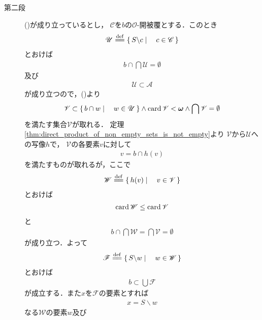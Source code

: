 \begin{sketch}
\begin{description}
			\item[第二段]
				()が成り立っているとし，
				$\mathscr{C}$を$b$の$\mathscr{O}$-開被覆とする．このとき
				\begin{align}
					\mathscr{U} \defeq \Set{S \backslash c}{c \in \mathscr{C}}
				\end{align}
				とおけば
				\begin{align}
					b \cap \bigcap \mathscr{U} = \emptyset
				\end{align}
				及び
				\begin{align}
					\mathscr{U} \subset \mathscr{A}
				\end{align}
				が成り立つので，()より
				\begin{align}
					\mathscr{V} \subset \left\{\, b \cap w \mid \quad w \in \mathscr{U}\, \right\}
					\wedge \operatorname{card} \mathscr{V} < {\boldsymbol \omega}
					\wedge \bigcap \mathscr{V} = \emptyset
				\end{align}
				を満たす集合$\mathscr{V}$が取れる．
				定理\ref{thm:direct_product_of_non_empty_sets_is_not_empty}より
				$\mathscr{V}$から$\mathscr{U}$への写像$h$で，
				$\mathscr{V}$の各要素$v$に対して
				\begin{align}
					v = b \cap h(v)
				\end{align}
				を満たすものが取れるが，ここで
				\begin{align}
					\mathscr{W} \defeq \Set{h(v)}{v \in \mathscr{V}}
				\end{align}
				とおけば
				\begin{align}
					\operatorname{card} \mathscr{W} \leq \operatorname{card} \mathscr{V}
				\end{align}
				と
				\begin{align}
					b \cap \bigcap \mathscr{W} = \bigcap \mathscr{V} = \emptyset
				\end{align}
				が成り立つ．よって
				\begin{align}
					\mathscr{F} \defeq \Set{S \backslash w}{w \in \mathscr{W}}
				\end{align}
				とおけば
				\begin{align}
					b \subset \bigcup \mathscr{F}
				\end{align}
				が成立する．また$x$を$\mathscr{F}$の要素とすれば
				\begin{align}
					x = S \backslash w
				\end{align}
				なる$\mathscr{W}$の要素$w$及び
				\begin{align}

\end{align}
\end{description}
\end{sketch}
